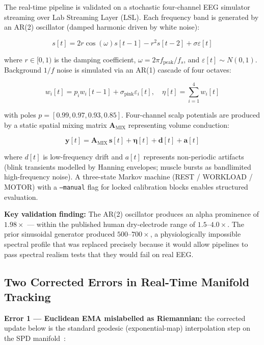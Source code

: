 \documentclass[11pt]{article}
\newcommand{\code}[1]{\texttt{#1}}
\begin{document}
The real-time pipeline is validated on a stochastic four-channel EEG simulator streaming over Lab Streaming Layer (LSL). Each frequency band is generated by an AR(2) oscillator (damped harmonic driven by white noise):

\begin{equation}
s[t] = 2r\cos(\omega)s[t-1] - r^2 s[t-2] + \sigma \varepsilon[t]
\end{equation}

where $r \in [0,1)$ is the damping coefficient, $\omega = 2\pi f_\text{peak}/f_s$, and $\varepsilon[t] \sim N(0,1)$. Background $1/f$ noise is simulated via an AR(1) cascade of four octaves:

\begin{equation}
w_i[t] = p_i w_i[t-1] + \sigma_\text{pink} \varepsilon_i[t], \quad \eta[t] = \sum_{i=1}^4 w_i[t]
\end{equation}

with poles $p = [0.99, 0.97, 0.93, 0.85]$. Four-channel scalp potentials are produced by a static spatial mixing matrix $\mathbf{A}_\text{MIX}$ representing volume conduction:

\begin{equation}
\mathbf{y}[t] = \mathbf{A}_\text{MIX}\, \mathbf{s}[t] + \boldsymbol{\eta}[t] + \mathbf{d}[t] + \mathbf{a}[t]
\end{equation}

where $d[t]$ is low-frequency drift and $a[t]$ represents non-periodic artifacts (blink transients modelled by Hanning envelopes; muscle bursts as bandlimited high-frequency noise). A three-state Markov machine (REST / WORKLOAD / MOTOR) with a \code{--manual} flag for locked calibration blocks enables structured evaluation.

\textbf{Key validation finding:} The AR(2) oscillator produces an alpha prominence of $1.98\times$ --- within the published human dry-electrode range of $1.5$--$4.0\times$. The prior sinusoidal generator produced $500$--$700\times$, a physiologically impossible spectral profile that was replaced precisely because it would allow pipelines to pass spectral realism tests that they would fail on real EEG.

\subsection{Two Corrected Errors in Real-Time Manifold Tracking}

\textbf{Error 1 --- Euclidean EMA mislabelled as Riemannian:} the corrected update below is the standard geodesic (exponential-map) interpolation step on the SPD manifold~\cite{pennec2006,barachant2012}:
\end{document}
